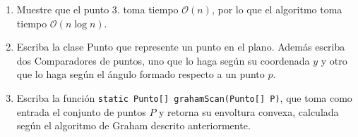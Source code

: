 \documentclass[dcc,uchile]{fcfmcourse}
\begin{document}
\begin{problems}
\begin{enumerate}[1.]
\begin{itemize}
\begin{center}
        \end{center}
    \end{itemize}
\end{enumerate}
\begin{enumerate}
    \item Muestre que el punto 3. toma tiempo $\mathcal{O}(n)$, por lo que el algoritmo toma tiempo $\mathcal{O}(n\log n)$.
    \item Escriba la clase Punto que represente un punto en el plano. Además escriba dos Comparadores de puntos, uno que lo haga según su coordenada $y$ y otro que lo haga según el ángulo formado respecto a un punto $p$.
    \item Escriba la función \texttt{static Punto[] grahamScan(Punto[] P)}, que toma como entrada el conjunto de puntos $P$ y retorna su envoltura convexa, calculada según el algoritmo de Graham descrito anteriormente.
\end{enumerate}
\end{problems}
\end{document}
